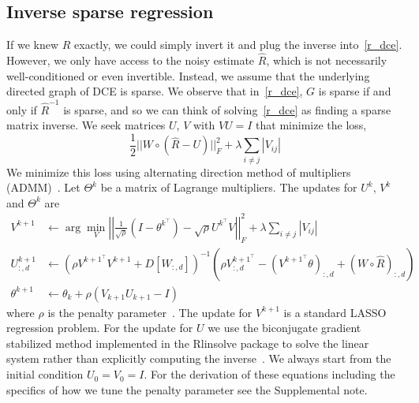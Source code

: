 \documentclass{article}
\begin{document}
\subsection{Inverse sparse regression}
If we knew $R$ exactly, we could simply invert it and plug the inverse
into~\eqref{r_dce}. However, we only have access to the noisy estimate $\hat{R}$,
which is not necessarily well-conditioned or even invertible. Instead, we assume that
the underlying directed graph of DCE is sparse. We observe that in~\eqref{r_dce}, $G$ is
sparse if and only if $\hat{R}^{-1}$ is sparse, and so we can think of
solving~\eqref{r_dce} as finding a sparse matrix inverse.
We seek matrices $U$, $V$ with $VU=I$ that minimize the loss,
\begin{equation}\label{opt_methods}
\frac{1}{2} ||W \circ \left(\hat{R} - U\right)||_F^2 + \lambda \sum_{i\neq j}|V_{ij}|
\end{equation}
We minimize this loss using alternating direction method of multipliers (ADMM)~\cite{Boyd2010}.
Let $\Theta^k$ be a matrix of Lagrange multipliers. The updates for $U^k$, $V^k$ and $\Theta^k$
are
\begin{align}
V^{k+1} &\leftarrow \arg \min_{V} \left|\left|\frac{1}{\sqrt{\rho}}\left(I-\theta^{k^\top}\right) -
      \sqrt{\rho} U^{k^\top} V\right|\right|_F^2 + \lambda \sum_{i\neq j} \left|V_{ij} \right| \\
U_{:, d}^{k+1} &\leftarrow \left(\rho V^{k+1 ^ \top} V^{k+1} + D[W_{:, d}]\right)^{-1} \left(\rho V^{k+1 ^ \top}_{:, d} -
  \left(V^{k+1 ^ \top} \theta\right)_{:, d} + \left(W \circ \hat{R}\right)_{:, d}\right) \\
\theta^{k+1} &\leftarrow \theta_{k} + \rho(V_{k+1}U_{k+1}-I)
\end{align}
where $\rho$ is the penalty parameter~\cite{Boyd2010}.
The update for $V^{k+1}$ is a standard LASSO regression problem. For the update for $U$ 
we use the biconjugate gradient stabilized method implemented
in the Rlinsolve package to solve the linear system
rather than explicitly computing the inverse~\cite{You2018}.
We always start from the initial condition $U_0 = V_0 = I$.
 For the derivation of these equations including
the specifics of how we tune
the penalty parameter see the Supplemental note.
\end{document}

